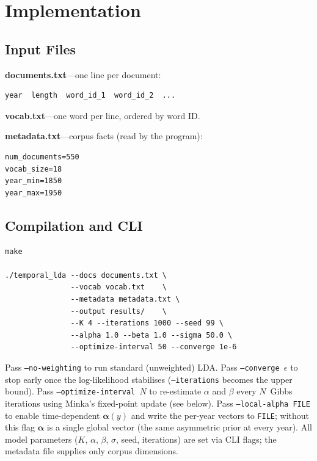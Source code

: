 \documentclass[11pt]{article}
\begin{document}
\section{Implementation}

\subsection{Input Files}

\textbf{documents.txt}\;---\;one line per document:
\begin{verbatim}
year  length  word_id_1  word_id_2  ...
\end{verbatim}

\textbf{vocab.txt}\;---\;one word per line, ordered by word ID.

\textbf{metadata.txt}\;---\;corpus facts (read by the program):
\begin{verbatim}
num_documents=550
vocab_size=18
year_min=1850
year_max=1950
\end{verbatim}

\subsection{Compilation and CLI}

\begin{verbatim}
make

./temporal_lda --docs documents.txt \
               --vocab vocab.txt    \
               --metadata metadata.txt \
               --output results/    \
               --K 4 --iterations 1000 --seed 99 \
               --alpha 1.0 --beta 1.0 --sigma 50.0 \
               --optimize-interval 50 --converge 1e-6
\end{verbatim}

Pass \texttt{--no-weighting} to run standard (unweighted) LDA.
Pass \texttt{--converge $\epsilon$} to stop early once the log-likelihood stabilises (\texttt{--iterations} becomes the upper bound).
Pass \texttt{--optimize-interval $N$} to re-estimate $\alpha$ and $\beta$ every $N$~Gibbs iterations using Minka's fixed-point update (see below).
Pass \texttt{--local-alpha FILE} to enable time-dependent $\boldsymbol\alpha(y)$ and write the per-year vectors to \texttt{FILE}; without this flag $\boldsymbol\alpha$ is a single global vector (the same asymmetric prior at every year).
All model parameters ($K$, $\alpha$, $\beta$, $\sigma$, seed, iterations) are set via CLI flags; the metadata file supplies only corpus dimensions.
\end{document}
